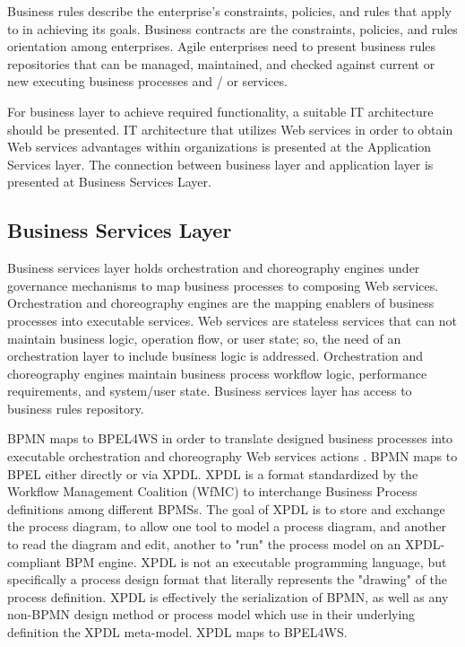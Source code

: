 \documentclass[12pt,a4paper,final,twoside,onecolumn,titlepage]{book}
\begin{document}
Business rules describe the enterprise’s constraints, policies, and rules that apply to in achieving its goals. Business contracts are the constraints, policies, and rules orientation among enterprises. Agile enterprises need to present business rules repositories that can be managed, maintained, and checked against current or new executing business processes and / or services.

For business layer to achieve required functionality, a suitable IT architecture should be presented. IT architecture that utilizes Web services in order to obtain Web services advantages within organizations is presented at the Application Services layer. The connection between business layer and application layer is presented at Business Services Layer.

\subsection{Business Services Layer}
Business services layer holds orchestration and choreography engines under governance mechanisms to map business processes to composing Web services. Orchestration and choreography engines are the mapping enablers of business processes into executable services. Web services are stateless services that can not maintain business logic, operation flow, or user state; so, the need of an orchestration layer to include business logic is addressed. Orchestration and choreography engines maintain business process workflow logic, performance requirements, and system/user state. Business services layer has access to business rules repository.

\gls{BPMN} maps to \gls{BPEL4WS} in order to translate designed business processes into executable orchestration and choreography Web services actions \cite{BS65}. \gls{BPMN} maps to \gls{BPEL} either directly or via \gls{XPDL}. \gls{XPDL} is a format standardized by the Workflow Management Coalition (\gls{WfMC}) to interchange Business Process definitions among different BPMSs. The goal of \gls{XPDL} is to store and exchange the process diagram, to allow one tool to model a process diagram, and another to read the diagram and edit, another to "run" the process model on an \gls{XPDL}-compliant \gls{BPM} engine. \gls{XPDL} is not an executable programming language, but specifically a process design format that literally represents the "drawing" of the process definition. \gls{XPDL} is effectively the serialization of \gls{BPMN}, as well as any non-\gls{BPMN} design method or process model which use in their underlying definition the \gls{XPDL} meta-model. \gls{XPDL} maps to \gls{BPEL4WS}.
\end{document}
